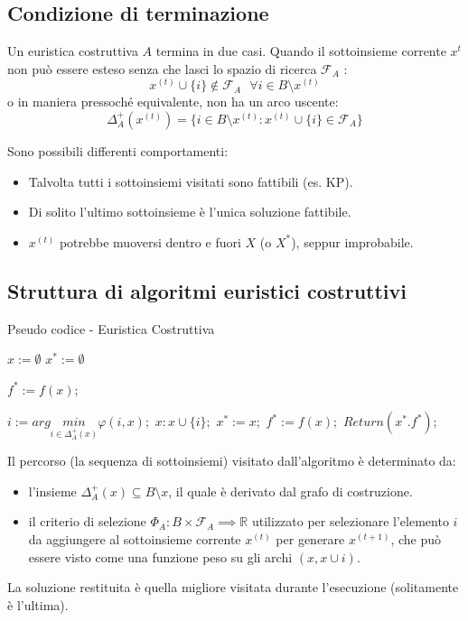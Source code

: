\documentclass{article}
\begin{document}
\subsection{Condizione di terminazione}
Un euristica costruttiva $A$ termina in due casi. Quando il sottoinsieme corrente $x^{t}$
non può essere esteso senza che lasci lo spazio di ricerca $\mathcal{F}_A$ :
$$x^{(t)}\cup\{i\}\notin\mathcal{F}_A\text{   }\forall i\in B\setminus x^{(t)}$$
o in maniera pressoché equivalente, non ha un arco uscente:
$$\Delta_A^+(x^{(t)})=\{i\in B\setminus x^{(t)}:x^{(t)}\cup\{i\}\in\mathcal{F}_A\}$$

Sono possibili differenti comportamenti:
\begin{itemize}
    \item Talvolta tutti i sottoinsiemi visitati sono fattibili (es. KP).
    \item Di solito l'ultimo sottoinsieme è l'unica soluzione fattibile.
    \item $x^{(t)}$ potrebbe muoversi dentro e fuori $X$ (o $X^*$), seppur improbabile.
\end{itemize}

\subsection{Struttura di algoritmi euristici costruttivi}
\begin{algorithm}[H]
    \caption{Pseudo codice - Euristica Costruttiva}
    \label{alg:cons_heu}
    \begin{algorithmic}
        \State $x:=\emptyset$
        \State $x^*:=\emptyset$

        \State $f^*:=f(x);$
        \Else
        \EndIf

        \State $i:=arg\underset{i\in\Delta_A^+(x)}{min}\varphi(i,x);$
        \State $x:x\cup\{i\};$
        \State $x^* := x;$
        \State $f^* := f(x);$
        \EndIf
        \EndWhile
        \State $Return(x^*.f^*);$
    \end{algorithmic}
\end{algorithm}

Il percorso (la sequenza di sottoinsiemi) visitato dall'algoritmo è determinato
da:
\begin{itemize}
    \item l'insieme $\Delta_A^+(x)\subseteq B\setminus x$, il quale è derivato
          dal grafo di costruzione.
    \item il criterio di selezione $\varPhi_A:B\times \mathcal{F}_A\implies\mathbb{R}$ utilizzato
          per selezionare l'elemento $i$ da aggiungere al sottoinsieme corrente $x^{(t)}$ per generare
          $x^{(t+1)}$, che può essere visto come una funzione peso su gli archi $(x,x\cup {i})$.
\end{itemize}
La soluzione restituita è quella migliore visitata durante l'esecuzione (solitamente è l'ultima).
\end{document}
